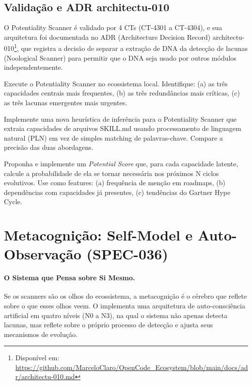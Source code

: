 \subsection{Validação e ADR architectu-010}

O Potentiality Scanner é validado por 4 CTs (CT-4301 a CT-4304), e sua
arquitetura foi documentada no ADR (Architecture Decision Record)
architectu-010\footnote{Disponível em:
\url{https://github.com/MarceloClaro/OpenCode_Ecosystem/blob/main/docs/adr/architectu-010.md}},
que registra a decisão de separar a extração de DNA da detecção de lacunas
(Noological Scanner) para permitir que o DNA seja usado por outros módulos
independentemente.

\begin{exercicio}
Execute o Potentiality Scanner no ecossistema local. Identifique: (a) as
três capacidades centrais mais frequentes, (b) as três redundâncias mais
críticas, (c) as três lacunas emergentes mais urgentes.
\end{exercicio}

\begin{exercicio}
Implemente uma nova heurística de inferência para o Potentiality Scanner
que extraia capacidades de arquivos SKILL.md usando processamento de
linguagem natural (PLN) em vez de simples matching de palavras-chave.
Compare a precisão das duas abordagens.
\end{exercicio}

\begin{exercicio}
Proponha e implemente um \emph{Potential Score} que, para cada capacidade
latente, calcule a probabilidade de ela se tornar necessária nos próximos
N ciclos evolutivos. Use como features: (a) frequência de menção em
roadmaps, (b) dependências com capacidades já presentes, (c) tendências
do Gartner Hype Cycle.
\end{exercicio}

\section{Metacognição: Self-Model e Auto-Observação (SPEC-036)}
\label{sec:metacognicao-self-model}
\nivelphd

\paragraph{O Sistema que Pensa sobre Si Mesmo.} Se os scanners são os olhos do ecossistema, a metacognição é o cérebro que reflete sobre o que esses olhos veem. O \opencodeeco{} implementa uma arquitetura de auto-consciência artificial em quatro níveis (N0 a N3), na qual o sistema não apenas detecta lacunas, mas reflete sobre o próprio processo de detecção e ajusta seus mecanismos de evolução.

